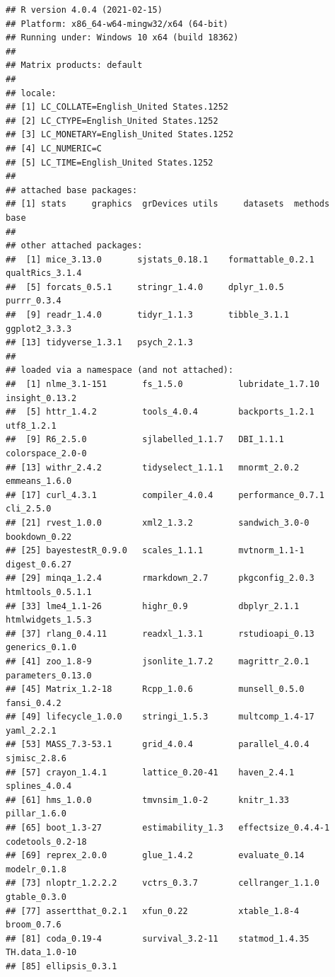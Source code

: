 \documentclass[
  english,
]{book}
\begin{document}
\begin{verbatim}
## R version 4.0.4 (2021-02-15)
## Platform: x86_64-w64-mingw32/x64 (64-bit)
## Running under: Windows 10 x64 (build 18362)
## 
## Matrix products: default
## 
## locale:
## [1] LC_COLLATE=English_United States.1252 
## [2] LC_CTYPE=English_United States.1252   
## [3] LC_MONETARY=English_United States.1252
## [4] LC_NUMERIC=C                          
## [5] LC_TIME=English_United States.1252    
## 
## attached base packages:
## [1] stats     graphics  grDevices utils     datasets  methods   base     
## 
## other attached packages:
##  [1] mice_3.13.0       sjstats_0.18.1    formattable_0.2.1 qualtRics_3.1.4  
##  [5] forcats_0.5.1     stringr_1.4.0     dplyr_1.0.5       purrr_0.3.4      
##  [9] readr_1.4.0       tidyr_1.1.3       tibble_3.1.1      ggplot2_3.3.3    
## [13] tidyverse_1.3.1   psych_2.1.3      
## 
## loaded via a namespace (and not attached):
##  [1] nlme_3.1-151       fs_1.5.0           lubridate_1.7.10   insight_0.13.2    
##  [5] httr_1.4.2         tools_4.0.4        backports_1.2.1    utf8_1.2.1        
##  [9] R6_2.5.0           sjlabelled_1.1.7   DBI_1.1.1          colorspace_2.0-0  
## [13] withr_2.4.2        tidyselect_1.1.1   mnormt_2.0.2       emmeans_1.6.0     
## [17] curl_4.3.1         compiler_4.0.4     performance_0.7.1  cli_2.5.0         
## [21] rvest_1.0.0        xml2_1.3.2         sandwich_3.0-0     bookdown_0.22     
## [25] bayestestR_0.9.0   scales_1.1.1       mvtnorm_1.1-1      digest_0.6.27     
## [29] minqa_1.2.4        rmarkdown_2.7      pkgconfig_2.0.3    htmltools_0.5.1.1 
## [33] lme4_1.1-26        highr_0.9          dbplyr_2.1.1       htmlwidgets_1.5.3 
## [37] rlang_0.4.11       readxl_1.3.1       rstudioapi_0.13    generics_0.1.0    
## [41] zoo_1.8-9          jsonlite_1.7.2     magrittr_2.0.1     parameters_0.13.0 
## [45] Matrix_1.2-18      Rcpp_1.0.6         munsell_0.5.0      fansi_0.4.2       
## [49] lifecycle_1.0.0    stringi_1.5.3      multcomp_1.4-17    yaml_2.2.1        
## [53] MASS_7.3-53.1      grid_4.0.4         parallel_4.0.4     sjmisc_2.8.6      
## [57] crayon_1.4.1       lattice_0.20-41    haven_2.4.1        splines_4.0.4     
## [61] hms_1.0.0          tmvnsim_1.0-2      knitr_1.33         pillar_1.6.0      
## [65] boot_1.3-27        estimability_1.3   effectsize_0.4.4-1 codetools_0.2-18  
## [69] reprex_2.0.0       glue_1.4.2         evaluate_0.14      modelr_0.1.8      
## [73] nloptr_1.2.2.2     vctrs_0.3.7        cellranger_1.1.0   gtable_0.3.0      
## [77] assertthat_0.2.1   xfun_0.22          xtable_1.8-4       broom_0.7.6       
## [81] coda_0.19-4        survival_3.2-11    statmod_1.4.35     TH.data_1.0-10    
## [85] ellipsis_0.3.1
\end{verbatim}
\end{document}
